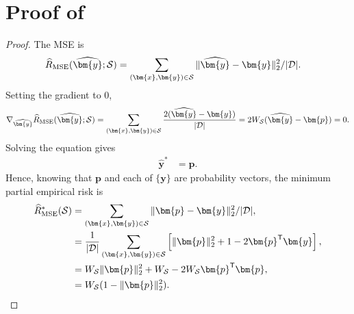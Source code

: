 \documentclass[letterpaper]{article} %
\newcommand{\bx}{{\bm{x}}}
\newcommand{\bp}{{\bm{p}}}
\newcommand{\by}{{\bm{y}}}
\newcommand{\T}{{\mathsf{T}}}
\newcommand{\cS}{{\cal{S}}}
\newcommand{\cD}{{\cal{D}}}
\begin{document}
\section{Proof of }
\label{app:equivalence_thm}
\lie*
\begin{proof} 
    The MSE is
    \begin{align*}
        \widehat{R}_{\mathrm{MSE}}(\widehat{\by};\cS) &= \sum_{(\bx,\by)\in\cS} \|\widehat{\by}-\by\|_2^2/|\cD|.
    \end{align*}
    Setting the gradient to 0, 
    \begin{align*}
        \nabla_{\widehat{\by}} \widehat{R}_{\mathrm{MSE}}(\widehat{\by};\cS)
        =  \sum_{(\bx,\by)\in\cS} \frac{2(\widehat{\by}-\by)}{|\cD|} 
        = 2W_{\cS}(\widehat{\by}-\bp)
        = 0.
    \end{align*}
    Solving the equation gives
    \begin{align*}
        \widehat{\by}^* &= \bp.
    \end{align*}
    Hence, knowing that $\bp$ and each of $\{\by\}$ are probability vectors, the minimum partial empirical risk is
    \begin{align*}
        \widehat{R}_{\mathrm{MSE}}^*(\cS) &= \sum_{(\bx,\by)\in\cS} \| \bp-\by \|_2^2/|\cD|,
        \\
        &= \frac{1}{|\cD|} \sum_{(\bx,\by)\in\cS} \left[\|\bp\|_2^2 + 1 - 2\bp^\T\by\right],
        \\
        &= W_{\cS}\|\bp\|_2^2 + W_{\cS} - 2W_{\cS}\bp^\T \bp,
        \\
        &= W_{\cS}(1-\|\bp\|_2^2).
    \end{align*}


\end{proof}
\end{document}

